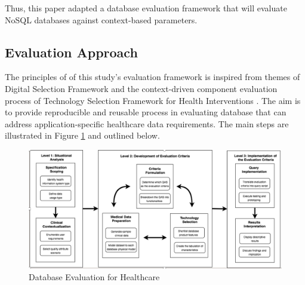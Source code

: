 \documentclass[5p]{elsarticle}
\begin{document}
Thus, this paper adapted a database evaluation framework that will evaluate NoSQL databases against context-based parameters. 

\subsection{Evaluation Approach}
The principles of of this study's evaluation framework is inspired from themes of Digital Selection Framework \cite{A.Ostrovsky20141} 
and the context-driven component evaluation process of Technology Selection Framework for Health Interventions \cite{C.Chan2010300}. 
The aim is to provide reproducible and reusable process in evaluating database that can address application-specific healthcare data requirements.
The main steps are illustrated in Figure \ref{fig.framework} and outlined below. 

\begin{figure}[ht]
    \centering
    \includegraphics[scale=0.27] {figure}
    \caption{Database Evaluation for Healthcare}\label{fig.framework}
\end{figure}
\end{document}
